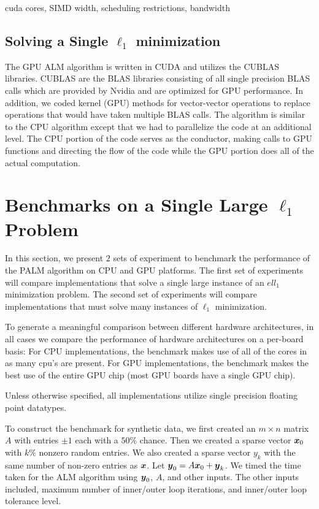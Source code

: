 \documentclass[10pt,twocolumn,letterpaper]{article}
\begin{document}
cuda cores, SIMD width, scheduling restrictions, bandwidth
\subsection{Solving a Single $\ell_1$ minimization}

The GPU ALM algorithm is written in CUDA and utilizes the CUBLAS libraries.
CUBLAS are the BLAS libraries consisting of all single precision BLAS calls
which are provided by Nvidia and are optimized for GPU performance. In
addition, we coded kernel (GPU) methods for vector-vector operations to replace
operations that would have taken multiple BLAS calls. The algorithm is similar
to the CPU algorithm except that we had to parallelize the code at an
additional level. The CPU portion of the code serves as the conductor, making
calls to GPU functions and directing the flow of the code while the GPU portion
does all of the actual computation.



\section{Benchmarks on a Single Large $\ell_1$ Problem}

In this section, we present $2$ sets of experiment to benchmark the performance
of the PALM algorithm on CPU and GPU platforms. 
The first set of experiments will compare implementations that solve a single
large instance of an $ell_1$ minimization problem.  
The second set of experiments will compare implementations that must solve
many instances of $\ell_1$ minimization.  

To generate a meaningful comparison between different hardware architectures,
in all cases we compare the performance of hardware architectures on a
per-board basis:  For CPU implementations, the benchmark makes use of all of
the cores in as many cpu's are present.  For GPU implementations, the benchmark
makes the best use of the entire GPU chip (most GPU boards have a single GPU
chip). 

Unless otherwise specified, all implementations utilize single precision
floating point datatypes.

To construct the benchmark for synthetic data, we first created an $m \times n$
matrix $A$ with entries $\pm 1$ each with a $50\%$ chance.  Then we created a
sparse vector ${\boldsymbol{x}}_0$ with $k\%$ nonzero random entries.  We also created a
sparse vector $y_k$ with the same number of non-zero entries as ${\boldsymbol{x}}$.  Let
$\boldsymbol{y}_0 = A {\boldsymbol{x}}_0 + \boldsymbol{y}_k$.  We timed the time taken for the ALM algorithm using
$\boldsymbol{y}_0$, $A$, and other inputs.  The other inputs included, maximum number of
inner/outer loop iterations, and inner/outer loop tolerance level.
\end{document}
